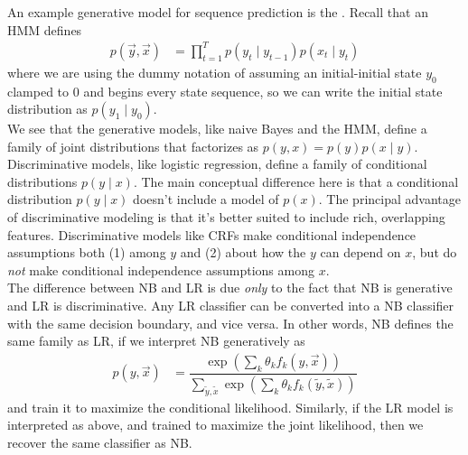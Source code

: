 \documentclass[11pt]{article}
\begin{document}
An example generative model for sequence prediction is the . Recall that an HMM defines
\begin{align}
p(\vec{y}, \vec{x}) &= \prod_{t = 1}^{T} p(y_t \mid y_{t-1}) p(x_t \mid y_t) 
\end{align}
where we are using the dummy notation of assuming an initial-initial state $y_0$ clamped to 0 and begins every state sequence, so we can write the initial state distribution as $p(y_1 \mid y_0)$. \\

\p We see that the generative models, like naive Bayes and the HMM, define a family of joint distributions that factorizes as $p(y, x) = p(y)p(x \mid y)$. Discriminative models, like logistic regression, define a family of conditional distributions $p(y \mid x)$. The main conceptual difference here is that a conditional distribution $p(y \mid x)$ doesn't include a model of $p(x)$. The principal advantage of discriminative modeling is that it's better suited to include rich, overlapping features. Discriminative models like CRFs make conditional independence assumptions both (1) among $y$ and (2) about how the $y$ can depend on $x$, but do \textit{not} make conditional independence assumptions among $x$.  \\

\p The difference between NB and LR is due \textit{only} to the fact that NB is generative and LR is discriminative. Any LR classifier can be converted into a NB classifier with the same decision boundary, and vice versa. In other words, NB defines the same family as LR, if we interpret NB generatively as 
\begin{align}
p(y, \vec{x}) &= \dfrac{
	\exp \left( \sum_k \theta_k f_k(y, \vec{x}) \right) 
}{
	\sum_{\widetilde{y}, \widetilde{x} } \exp \left( \sum_k \theta_k f_k(\widetilde y, \widetilde x)  \right)
}
\end{align}
and train it to maximize the conditional likelihood. Similarly, if the LR model is interpreted as above, and trained to maximize the joint likelihood, then we recover the same classifier as NB.

\end{document}

